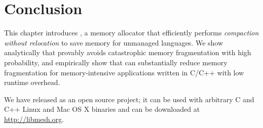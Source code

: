 \section{Conclusion}
\label{sec:conclusion}

This chapter introduces \Mesh{}, a memory allocator that efficiently
performs \textit{compaction without relocation} to save memory for
unmanaged languages.  We show analytically that \Mesh{} provably
avoids catastrophic memory fragmentation with high probability, and
empirically show that \Mesh{} can substantially reduce memory
fragmentation for memory-intensive applications written in C/C++ with
low runtime overhead. %

We have released \Mesh as an open source
project; it can be used with arbitrary C and C++ Linux and Mac OS X
binaries and can be downloaded at
\url{http://libmesh.org}.
